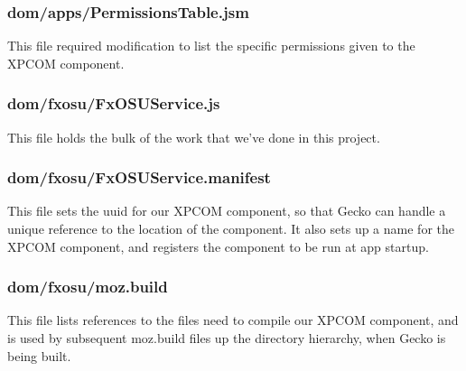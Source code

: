 \documentclass[12pt]{article}
\begin{document}
\subsubsection{dom/apps/PermissionsTable.jsm}
This file required modification to list the specific permissions given to the XPCOM component.

\subsubsection{dom/fxosu/FxOSUService.js}
This file holds the bulk of the work that we've done in this project.

\subsubsection{dom/fxosu/FxOSUService.manifest}
This file sets the uuid for our XPCOM component, so that Gecko can handle a unique reference to the location of the component. It also sets up a name for the XPCOM component, and registers the component to be run at app startup.

\subsubsection{dom/fxosu/moz.build}
This file lists references to the files need to compile our XPCOM component, and is used by subsequent moz.build files up the directory hierarchy, when Gecko is being built.
\end{document}
